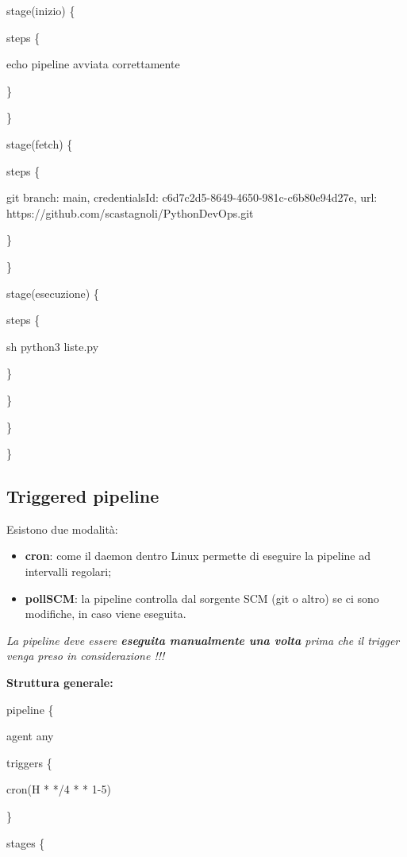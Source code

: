 stage(\textquotesingle inizio\textquotesingle) \{

steps \{

echo \textquotesingle pipeline avviata correttamente\textquotesingle{}

\}

\}

stage(\textquotesingle fetch\textquotesingle) \{

steps \{

git branch: \textquotesingle main\textquotesingle, credentialsId:
\textquotesingle c6d7c2d5-8649-4650-981c-c6b80e94d27e\textquotesingle,
url:
\textquotesingle https://github.com/scastagnoli/PythonDevOps.git\textquotesingle{}

\}

\}

stage(\textquotesingle esecuzione\textquotesingle) \{

steps \{

sh \textquotesingle python3 liste.py\textquotesingle{}

\}

\}

\}

\}

\subsection{Triggered pipeline}\label{triggered-pipeline}

Esistono due modalità:

\begin{itemize}
\item
  \textbf{cron}: come il daemon dentro Linux permette di eseguire la
  pipeline ad intervalli regolari;
\item
  \textbf{pollSCM}: la pipeline controlla dal sorgente SCM (git o altro)
  se ci sono modifiche, in caso viene eseguita.
\end{itemize}

\emph{La pipeline deve essere \textbf{eseguita manualmente una volta}
prima che il trigger venga preso in considerazione !!!}

\textbf{Struttura generale:}

pipeline \{

agent any

triggers \{

cron(\textquotesingle H * */4 * * 1-5\textquotesingle)

\}

stages \{

